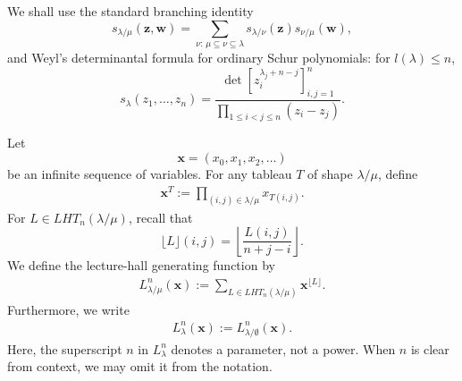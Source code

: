 \documentclass[11pt]{amsart}
\theoremstyle{plain}
\renewcommand\ell{l}
\numberwithin{equation}{section}
\numberwithin{theorem}{section}
\numberwithin{figure}{section}
\begin{document}
We shall use the standard branching identity
\[
    s_{\lambda/\mu}(\mathbf z,\mathbf w)
    =
    \sum_{\nu:\,\mu\subseteq\nu\subseteq\lambda}
    s_{\lambda/\nu}(\mathbf z)s_{\nu/\mu}(\mathbf w),
\]
and Weyl's determinantal formula for ordinary Schur polynomials: for
\(\ell(\lambda)\le n\),
\[
    s_\lambda(z_1,\ldots,z_n)
    =
    \frac{\det[z_i^{\lambda_j+n-j}]_{i,j=1}^{n}}{\prod_{1\le i<j\le n}(z_i-z_j)} .
\]

Let
\[
    \mathbf{x}=(x_0,x_1,x_2,\ldots)
\]
be an infinite sequence of variables. For any tableau $T$ of shape
$\lambda/\mu$, define
\begin{align*}
    \mathbf{x}^T:=\prod_{(i,j)\in\lambda/\mu}x_{T(i,j)}.
\end{align*}
For $L\in LHT_n(\lambda/\mu)$, recall that
\[
    \lfloor L\rfloor(i,j)
    =
    \left\lfloor\frac{L(i,j)}{n+j-i}\right\rfloor .
\]
We define the lecture-hall generating function by
\begin{align*}
    L_{\lambda/\mu}^n(\mathbf{x})
    :=
    \sum_{L\in LHT_n(\lambda/\mu)}\mathbf{x}^{\lfloor L\rfloor}.
\end{align*}
Furthermore, we write
\begin{align*}
L_{\lambda}^n(\mathbf{x}):=L_{\lambda/\emptyset}^n(\mathbf{x}).
\end{align*}
Here, the superscript $n$ in $L_{\lambda}^n$ denotes a parameter, not a power.
When $n$ is clear from context, we may omit it from the notation.
\end{document}
